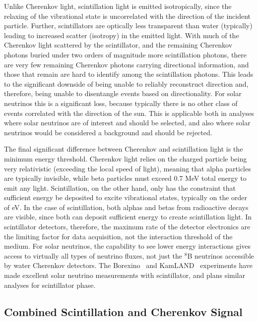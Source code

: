Unlike Cherenkov light, scintillation light is emitted isotropically, since the relaxing of the vibrational state is uncorrelated with the direction of the incident particle.
Further, scintillators are optically less transparent than water (typically) leading to increased scatter (isotropy) in the emitted light.
With much of the Cherenkov light scattered by the scintillator, and the remaining Cherenkov photons buried under two orders of magnitude more scintillation photons, there are very few remaining Cherenkov photons carrying directional information, and those that remain are hard to identify among the scintillation photons.
This leads to the significant downside of being unable to reliably reconstruct direction and, therefore, being unable to disentangle events based on directionality. 
For solar neutrinos this is a significant loss, because typically there is no other class of events correlated with the direction of the sun.
This is applicable both in analyses where solar neutrinos are of interest and should be selected, and also where solar neutrinos would be considered a background and should be rejected.

The final significant difference between Cherenkov and scintillation light is the minimum energy threshold.
Cherenkov light relies on the charged particle being very relativistic (exceeding the local speed of light), meaning that alpha particles are typically invisible, while beta particles must exceed 0.7 MeV total energy to emit any light.
Scintillation, on the other hand, only has the constraint that sufficient energy be deposited to excite vibrational states, typically on the order of eV.
In the case of scintillation, both alphas and betas from radioactive decays are visible, since both can deposit sufficient energy to create scintillation light.
In scintillator detectors, therefore, the maximum rate of the detector electronics are the limiting factor for data acquisition, not the interaction threshold of the medium.
For solar neutrinos, the capability to see lower energy interactions gives access to virtually all types of neutrino fluxes, not just the $^8$B neutrinos accessible by water Cherenkov detectors.
The Borexino~\cite{borexino} and KamLAND~\cite{kamland} experiments have made excellent solar neutrino measurements with scintillator, and {\snop} plans similar analyses for scintillator phase.

\subsection{Combined Scintillation and Cherenkov Signal}

